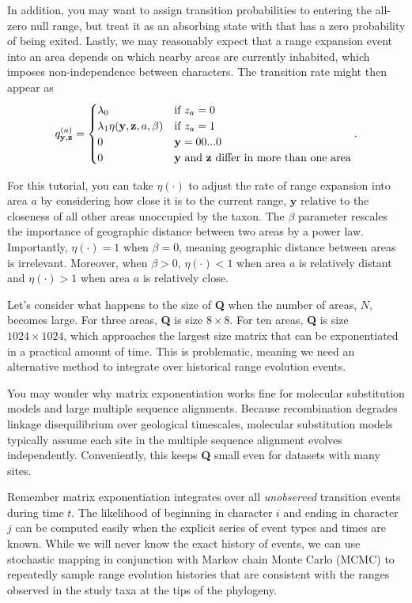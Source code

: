 \documentclass[11pt]{article}
\begin{document}
In addition, you may want to assign transition probabilities to entering the all-zero null range, but treat it as an absorbing state with that has a zero probability of being exited. 
Lastly, we may reasonably expect that a range expansion event into an area depends on which nearby areas are currently inhabited, which imposes non-independence between characters.
The transition rate might then appear as
\[
q^{(a)}_{\textbf{y},\textbf{z}} =
\begin{cases}
\lambda_0 & \text{if $z_a=0$}  \\
\lambda_1 \eta(\textbf{y}, \textbf{z}, a, \beta) & \text{if $z_a=1$} \\
0 & \mathbf{y} = 00...0 \\
0 & \text{\textbf{y} and \textbf{z} differ in more than one area}
\end{cases}.
\]

For this tutorial, you can take $\eta(\cdot)$ to adjust the rate of range expansion into area $a$ by considering how close it is to the current range, $\textbf{y}$ relative to the closeness of all other areas unoccupied by the taxon.
The $\beta$ parameter rescales the importance of geographic distance between two areas by a power law.
Importantly, $\eta(\cdot) = 1$ when $\beta=0$, meaning geographic distance between areas is irrelevant.
Moreover, when $\beta > 0$, $\eta(\cdot) < 1$ when area $a$ is relatively distant and $\eta(\cdot) > 1$ when area $a$ is relatively close.

Let's consider what happens to the size of \textbf{Q} when the number of areas, $N$, becomes large.
For three areas, \textbf{Q} is size $8 \times 8$.
For ten areas, \textbf{Q} is size $1024 \times 1024$, which approaches the largest size matrix that can be exponentiated in a practical amount of time.
This is problematic, meaning we need an alternative method to integrate over historical range evolution events.

You may wonder why matrix exponentiation works fine for molecular substitution models and large multiple sequence alignments.
Because recombination degrades linkage disequilibrium over geological timescales, molecular substitution models typically assume each site in the multiple sequence alignment evolves independently.
Conveniently, this keeps \textbf{Q} small even for datasets with many sites.

Remember matrix exponentiation integrates over all \textit{unobserved} transition events during time $t$.
The likelihood of beginning in character $i$ and ending in character $j$ can be computed easily when the explicit series of event types and times are known.
While we will never know the exact history of events, we can use stochastic mapping in conjunction with Markov chain Monte Carlo (MCMC) to repeatedly sample range evolution histories that are consistent with the ranges observed in the study taxa at the tips of the phylogeny.
\end{document}
